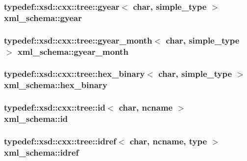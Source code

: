 \subsubsection[{\texorpdfstring{gyear}{gyear}}]{\setlength{\rightskip}{0pt plus 5cm}typedef\+::xsd\+::cxx\+::tree\+::gyear$<$ char, {\bf simple\+\_\+type} $>$ {\bf xml\+\_\+schema\+::gyear}}\hypertarget{namespacexml__schema_a180526e3ae3592e56a0037c1f2ec8e5b}{}\label{namespacexml__schema_a180526e3ae3592e56a0037c1f2ec8e5b}
\subsubsection[{\texorpdfstring{gyear\+\_\+month}{gyear_month}}]{\setlength{\rightskip}{0pt plus 5cm}typedef\+::xsd\+::cxx\+::tree\+::gyear\+\_\+month$<$ char, {\bf simple\+\_\+type} $>$ {\bf xml\+\_\+schema\+::gyear\+\_\+month}}\hypertarget{namespacexml__schema_a8da9330a638589b1ef456991753a2804}{}\label{namespacexml__schema_a8da9330a638589b1ef456991753a2804}
\subsubsection[{\texorpdfstring{hex\+\_\+binary}{hex_binary}}]{\setlength{\rightskip}{0pt plus 5cm}typedef\+::xsd\+::cxx\+::tree\+::hex\+\_\+binary$<$ char, {\bf simple\+\_\+type} $>$ {\bf xml\+\_\+schema\+::hex\+\_\+binary}}\hypertarget{namespacexml__schema_ac9db22d87610e02355669749770fac89}{}\label{namespacexml__schema_ac9db22d87610e02355669749770fac89}
\subsubsection[{\texorpdfstring{id}{id}}]{\setlength{\rightskip}{0pt plus 5cm}typedef\+::xsd\+::cxx\+::tree\+::id$<$ char, {\bf ncname} $>$ {\bf xml\+\_\+schema\+::id}}\hypertarget{namespacexml__schema_a551698f0c4c57e5e194dc1f2892da3ef}{}\label{namespacexml__schema_a551698f0c4c57e5e194dc1f2892da3ef}
\subsubsection[{\texorpdfstring{idref}{idref}}]{\setlength{\rightskip}{0pt plus 5cm}typedef\+::xsd\+::cxx\+::tree\+::idref$<$ char, {\bf ncname}, {\bf type} $>$ {\bf xml\+\_\+schema\+::idref}}\hypertarget{namespacexml__schema_a50fe7403f3e6be3634976c84c1ea1f8c}{}\label{namespacexml__schema_a50fe7403f3e6be3634976c84c1ea1f8c}
